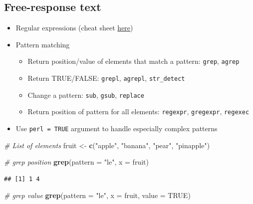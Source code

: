 \documentclass[
  openany]{book}
\newenvironment{Shaded}{\begin{snugshade}}{\end{snugshade}}
\newcommand{\CommentTok}[1]{\textcolor[rgb]{0.56,0.35,0.01}{\textit{#1}}}
\newcommand{\DataTypeTok}[1]{\textcolor[rgb]{0.13,0.29,0.53}{#1}}
\newcommand{\KeywordTok}[1]{\textcolor[rgb]{0.13,0.29,0.53}{\textbf{#1}}}
\newcommand{\NormalTok}[1]{#1}
\newcommand{\OtherTok}[1]{\textcolor[rgb]{0.56,0.35,0.01}{#1}}
\newcommand{\StringTok}[1]{\textcolor[rgb]{0.31,0.60,0.02}{#1}}
\providecommand{\tightlist}{%
  \setlength{\itemsep}{0pt}\setlength{\parskip}{0pt}}
\begin{document}
\hypertarget{free-response-text}{%
\subsection{Free-response text}\label{free-response-text}}

\begin{itemize}
\tightlist
\item
  Regular expressions (cheat sheet \href{https://rstudio.com/wp-content/uploads/2016/09/RegExCheatsheet.pdf}{here})
\item
  Pattern matching

  \begin{itemize}
  \tightlist
  \item
    Return position/value of elements that match a pattern: \texttt{grep}, \texttt{agrep}
  \item
    Return TRUE/FALSE: \texttt{grepl}, \texttt{agrepl}, \texttt{str\_detect}
  \item
    Change a pattern: \texttt{sub}, \texttt{gsub}, \texttt{replace}
  \item
    Return position of pattern for all elements: \texttt{regexpr}, \texttt{gregexpr}, \texttt{regexec}
  \end{itemize}
\item
  Use \texttt{perl\ =\ TRUE} argument to handle especially complex patterns
\end{itemize}

\begin{Shaded}
\begin{Highlighting}[]
\CommentTok{# List of elements}
\NormalTok{fruit <-}\StringTok{ }\KeywordTok{c}\NormalTok{(}\StringTok{"apple"}\NormalTok{, }\StringTok{"banana"}\NormalTok{, }\StringTok{"pear"}\NormalTok{, }\StringTok{"pinapple"}\NormalTok{)}

\CommentTok{# grep position}
\KeywordTok{grep}\NormalTok{(}\DataTypeTok{pattern =} \StringTok{"le"}\NormalTok{, }\DataTypeTok{x =}\NormalTok{ fruit)}
\end{Highlighting}
\end{Shaded}

\begin{verbatim}
## [1] 1 4
\end{verbatim}

\begin{Shaded}
\begin{Highlighting}[]
\CommentTok{# grep value}
\KeywordTok{grep}\NormalTok{(}\DataTypeTok{pattern =} \StringTok{"le"}\NormalTok{, }\DataTypeTok{x =}\NormalTok{ fruit, }\DataTypeTok{value =} \OtherTok{TRUE}\NormalTok{)}
\end{Highlighting}
\end{Shaded}
\end{document}

